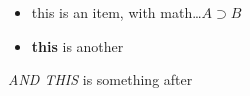 \begin{itemize}
\item this is an item, with math\dots $A\supset B$ \item 
\textbf{this} is another
\end{itemize} 
\emph{AND THIS} is something after
